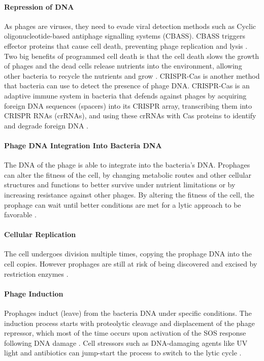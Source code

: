 \paragraph{Repression of DNA}
As phages are viruses, they need to evade viral detection methods such as Cyclic oligonucleotide-based antiphage signalling systems (CBASS). 
CBASS triggers effector proteins that cause cell death, preventing phage replication and lysis \cite{banhBacterialCGASSenses2023}. 
Two big benefits of programmed cell death is that the cell death slows the growth of phages and the dead cells release nutrients into the environment, allowing other bacteria to recycle the nutrients and grow \cite{warwick-dugdaleHosthijackingPlanktonicPiracy2019}. \newline
CRISPR-Cas is another method that bacteria can use to detect the presence of phage DNA. 
CRISPR-Cas is an adaptive immune system in bacteria that defends against phages by acquiring foreign DNA sequences (spacers) into its CRISPR array, transcribing them into CRISPR RNAs (crRNAs), and using these crRNAs with Cas proteins to identify and degrade foreign DNA \cite{levyCRISPRAdaptationBiases2015}. 
\paragraph{Phage DNA Integration Into Bacteria DNA}
The DNA of the phage is able to integrate into the bacteria's DNA. 
Prophages can alter the fitness of the cell, by changing metabolic routes and other cellular structures and functions to better survive under nutrient limitations or by increasing resistance against other phages. 
By altering the fitness of the cell, the prophage can wait until better conditions are met for a lytic approach to be favorable \cite{warwick-dugdaleHosthijackingPlanktonicPiracy2019}. 
\paragraph{Cellular Replication}
The cell undergoes division multiple times, copying the prophage DNA into the cell copies. 
However prophages are still at risk of being discovered and excised by restriction enzymes \cite{sharpMolecularEvolutionBacteriophages1986}. 
\paragraph{Phage Induction}
Prophages induct (leave) from the bacteria DNA under specific conditions. 
The induction process starts with proteolytic cleavage and displacement of the phage repressor, which most of the time occurs upon activation of the SOS response following DNA damage \cite{waldorPhageRegulatoryCircuits2005}. 
Cell stressors such as DNA-damaging agents like UV light and antibiotics can jump-start the process to switch to the lytic cycle \cite{stoneUnderstandingExploitingPhage2019, fortierImportanceProphagesEvolution2013}. 

